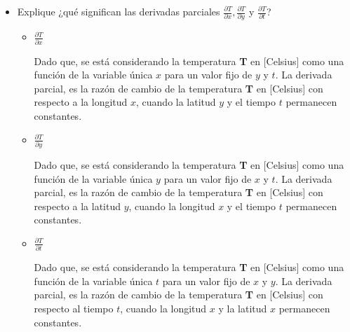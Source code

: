 \documentclass[12pt]{article}
\begin{document}
\begin{itemize}[format=\textbf]

\item Explique ¿qué significan las derivadas parciales $\frac{\partial T}{\partial x}, \frac{\partial T}{\partial y}$ y $\frac{\partial T}{\partial t}$?

  \begin{itemize}
    
  \item $\frac{\partial T}{\partial x}$

    Dado que, se está considerando la temperatura \textbf{T} en [Celsius] como una función de la variable única $x$ para un valor fijo de $y$ y $t$.
    La derivada parcial, es la razón de cambio de la temperatura \textbf{T} en [Celsius] con respecto a la longitud $x$, cuando la latitud $y$ y el tiempo $t$ permanecen constantes.
    
  \item $\frac{\partial T}{\partial y}$

    Dado que, se está considerando la temperatura \textbf{T} en [Celsius] como una función de la variable única $y$ para un valor fijo de $x$ y $t$.
    La derivada parcial, es la razón de cambio de la temperatura \textbf{T} en [Celsius] con respecto a la latitud $y$, cuando la longitud $x$ y el tiempo $t$ permanecen constantes.
    
  \item $\frac{\partial T}{\partial t}$

    Dado que, se está considerando la temperatura \textbf{T} en [Celsius] como una función de la variable única $t$ para un valor fijo de $x$ y $y$.
    La derivada parcial, es la razón de cambio de la temperatura \textbf{T} en [Celsius] con respecto al tiempo $t$, cuando la longitud $x$ y la latitud $x$ permanecen constantes.
    
  \end{itemize}


\end{itemize}
\end{document}
